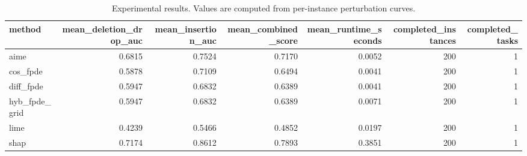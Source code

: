 \begin{table}[t]
\caption{Experimental results. Values are computed from per-instance perturbation curves.}
\label{tab:main_results_computed}
\centering
\begin{tabular}{lrrrrrr}
\toprule
method & mean\_deletion\_drop\_auc & mean\_insertion\_auc & mean\_combined\_score & mean\_runtime\_seconds & completed\_instances & completed\_tasks \\
\midrule
aime & 0.6815 & 0.7524 & 0.7170 & 0.0052 & 200 & 1 \\
cos\_fpde & 0.5878 & 0.7109 & 0.6494 & 0.0041 & 200 & 1 \\
diff\_fpde & 0.5947 & 0.6832 & 0.6389 & 0.0041 & 200 & 1 \\
hyb\_fpde\_grid & 0.5947 & 0.6832 & 0.6389 & 0.0071 & 200 & 1 \\
lime & 0.4239 & 0.5466 & 0.4852 & 0.0197 & 200 & 1 \\
shap & 0.7174 & 0.8612 & 0.7893 & 0.3851 & 200 & 1 \\
\bottomrule
\end{tabular}

\end{table}
